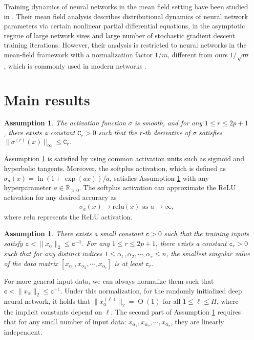 \documentclass{article}
\numberwithin{equation}{section}
\newcommand{\fc}{{\mathtt c}}
\newcommand{\fC}{{\mathtt C}}
\newcommand{\bR}{{\mathbb R}}
\newcommand{\al}{\alpha}
\DeclareMathOperator{\OO}{O}
\renewcommand{\leq}{\leqslant}
\newcommand{\1}{\mathds{1}}
\theoremstyle{plain} %
\newtheorem{assumption}[theorem]{Assumption}
\begin{document}
Training dynamics of neural networks in the mean field setting have been studied in \cite{mei2019mean,song2018mean, araujo2019mean,nguyen2019mean,sirignano2019mean,chizat2018global}.
 Their mean field analysis describes distributional dynamics of neural network parameters via certain nonlinear partial differential equations, in the asymptotic regime of large network sizes and large number of stochastic gradient descent training iterations. However,
their analysis is restricted to neural networks in the mean-field framework with a normalization factor $1/m$, different from ours $1/\sqrt m$, which is commonly used in modern networks \cite{glorot2010understanding}.



\section{Main results}

\begin{assumption}\label{a:sigmaasup}
The activation function $\sigma$ is smooth, and for any $1\leq r\leq 2p+1$, there exists a constant $\fC_r>0$ such that the $r$-th derivative of $\sigma$ satisfies
$
\|\sigma^{(r)}(x)\|_\infty\leq \fC_r.
$
\end{assumption}


Assumption \ref{a:sigmaasup} is  satisfied by using common  activation units such as sigmoid and hyperbolic tangents. Moreover, the softplus activation,  which is defined as $\sigma_a(x)=\ln(1+\exp(a x))/a$,  satisfies Assumption \ref{a:sigmaasup} with any hyperparameter $a \in \bR_{>0}$. The softplus activation can approximate the ReLU activation  for any desired accuracy as 
\begin{align*}
\sigma_{a}(x) \rightarrow \mathrm{relu}(x) \text{ as } a\rightarrow \infty,
\end{align*}
where $\mathrm{relu}$ represents the ReLU activation.



\begin{assumption}\label{a:nonlinear}
There exists a small constant $\fc>0$ such that the training inputs satisfy $\fc<\|x_\al\|_2\leq \fc^{-1}$. For any $1\leq r\leq 2p+1$, there exists a constant $\fc_r>0$ such that for any distinct indices $1\leq \al_1,\al_2,\cdots, \al_r\leq n$, the smallest singular value of the data matrix $[x_{\al_1}, x_{\al_2},\cdots, x_{\al_r}]$ is at least $\fc_r$.
\end{assumption}

For more general input data, we can always normalize them such that 
$\fc<\|x_\al\|_2\leq \fc^{-1}$. Under this normalization, for the randomly initialized deep neural network, it holds that $\|x_\al^{(\ell)}\|_2=\OO(1)$ for all $1\leq \ell\leq H$, where the implicit constants depend on $\ell$. The second part of Assumption \ref{a:nonlinear} requires that for any small number of input data: $x_{\al_1}, x_{\al_2},\cdots, x_{\al_r}$, they are linearly independent.
\end{document}
